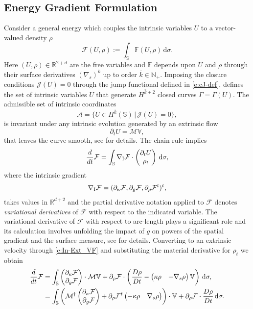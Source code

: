 \documentclass[11pt]{amsart}
\theoremstyle{plain}
\newcommand{\beq}{\begin{equation}}
\newcommand{\eeq}{\end{equation}}
\def\cA{{\mathcal A}}
\def\cF{{\mathcal F}}
\def\cJ{{\mathcal J}}
\def\cM{{\mathcal M}}
\def\mbbF{\mathbb{F}}
\def\mbbN{\mathbb{N}}
\def\mbbR{\mathbb{R}}
\def\mbbS{\mathbb{S}}
\def\mbbV{\mathbb{V}}
\def\mrI{\textrm I}
\def\mrW{\textrm W}
\def\cF{{\mathcal F}}
\def\bpm{\begin{pmatrix}}
\def\epm{\end{pmatrix}}
\def\rmd{\mathrm d}
\numberwithin{equation}{section}
\theoremstyle{plain}
\newtheorem{remark}{Remark}
\begin{document}

\subsection{Energy Gradient Formulation}
Consider a general energy which couples the intrinsic variables $U$ to a vector-valued density $\rho$
\beq\label{e:Eng_V}
\cF(U,\rho):=\int_\mbbS \mbbF(U,\rho)\,\rmd \sigma.
\eeq
Here $(U,\rho)\in\mbbR^{2+d}$ are the free variables and $\mbbF$ depends upon $U$ and $\rho$ through their surface derivatives $(\nabla_s)^k$ up to order $\bar k\in\mbbN_+.$ 
Imposing the closure conditions $\cJ(U)=0$ through the jump functional defined in \eqref{e:cJ-def},
defines the set of intrinsic variables $U$  that generate  $H^{\bar k+2}$ closed curves $\Gamma=\Gamma(U).$  The admissible set of intrinsic coordinates
$$\cA=\{U\in H^{\bar k}(\mbbS)\,\bigl|\, \cJ(U)=0\},$$
is invariant under any intrinsic evolution generated by an extrinsic flow
$$ \partial_t U = \cM \mbbV, $$
that leaves the curve smooth,
see \cite{NPW_25} for details.  The chain rule implies
$$ \frac{d}{dt} \cF = \int_\mbbS \nabla_\mrI \cF \cdot \bpm \partial_t U\cr \rho_t\epm
\, \rmd \sigma,$$
 where the intrinsic gradient 
 \beq\label{e:Int_grad}\nabla_\mrI \cF=(\partial_\kappa \cF, \partial_g\cF, \partial_\rho\cF^t)^t,
 \eeq 
 takes values in $\mbbR^{d+2}$ and the partial derivative notation applied to $\cF$ denotes {\sl variational derivatives} of $\cF$ with respect to the indicated variable.
 The variational derivative of $\cF$ with respect to arc-length plays a significant role and its calculation involves unfolding the impact of $g$ on powers of the spatial gradient and the surface measure, see \cite{NPW_25} for details.
Converting to an extrinsic velocity through \eqref{e:In-Ext_VF} and substituting the material derivative for $\rho_t$ we obtain
$$
\begin{aligned}
 \frac{d}{dt} \cF &=
 \int_\mbbS \bpm\partial_\kappa \cF\cr \partial_g\cF \epm \cdot \cM\mbbV + \partial_\rho\cF  \cdot\left(\frac{D\rho}{Dt}- \bpm \kappa \rho & -\nabla_s \rho \epm \mbbV\right) \,\rmd \sigma,\\
 &= \int_\mbbS \left( \cM^\dag \bpm\partial_\kappa \cF\cr \partial_g\cF \epm  +\partial_\rho\cF^t  \bpm -\kappa \rho & \nabla_s \rho \epm  \right)\cdot  \mbbV  + \partial_\rho\cF\cdot \frac{D\rho}{Dt}\, \rmd \sigma. 
 \end{aligned}$$
\end{document}
